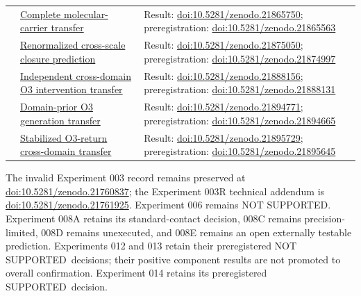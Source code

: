 \documentclass[11pt,a4paper]{article}
\newcommand{\statussupported}{\textsf{SUPPORTED}}
\newcommand{\statusnotsupported}{\textsf{NOT SUPPORTED}}
\begin{document}
\begin{longtable}{@{}>{\raggedright\arraybackslash}p{1.2cm}>{\raggedright\arraybackslash}p{5.0cm}>{\raggedright\arraybackslash}p{7.8cm}@{}}
010 & \href{https://github.com/SIEL-Research/Subjectivity-Intersection-Mathematics/tree/main/experiments/010_complete_molecular_carrier_transfer}{Complete molecular-carrier transfer} & Result: \href{https://doi.org/10.5281/zenodo.21865750}{doi:10.5281/zenodo.21865750}; preregistration: \href{https://doi.org/10.5281/zenodo.21865563}{doi:10.5281/zenodo.21865563} \\
011 & \href{https://github.com/SIEL-Research/Subjectivity-Intersection-Mathematics/tree/main/experiments/011_renormalized_cross_scale_closure_prediction}{Renormalized cross-scale closure prediction} & Result: \href{https://doi.org/10.5281/zenodo.21875050}{doi:10.5281/zenodo.21875050}; preregistration: \href{https://doi.org/10.5281/zenodo.21874997}{doi:10.5281/zenodo.21874997} \\
012 & \href{https://github.com/SIEL-Research/Subjectivity-Intersection-Mathematics/tree/main/experiments/012_cross_domain_o3_intervention_transfer}{Independent cross-domain O3 intervention transfer} & Result: \href{https://doi.org/10.5281/zenodo.21888156}{doi:10.5281/zenodo.21888156}; preregistration: \href{https://doi.org/10.5281/zenodo.21888131}{doi:10.5281/zenodo.21888131} \\
013 & \href{https://github.com/SIEL-Research/Subjectivity-Intersection-Mathematics/tree/main/experiments/013_domain_prior_o3_generation_transfer}{Domain-prior O3 generation transfer} & Result: \href{https://doi.org/10.5281/zenodo.21894771}{doi:10.5281/zenodo.21894771}; preregistration: \href{https://doi.org/10.5281/zenodo.21894665}{doi:10.5281/zenodo.21894665} \\
014 & \href{https://github.com/SIEL-Research/Subjectivity-Intersection-Mathematics/tree/main/experiments/014_stabilized_o3_return_cross_domain_transfer}{Stabilized O3-return cross-domain transfer} & Result: \href{https://doi.org/10.5281/zenodo.21895729}{doi:10.5281/zenodo.21895729}; preregistration: \href{https://doi.org/10.5281/zenodo.21895645}{doi:10.5281/zenodo.21895645} \\
\bottomrule
\end{longtable}

The invalid Experiment 003 record remains preserved at \href{https://doi.org/10.5281/zenodo.21760837}{doi:10.5281/zenodo.21760837}; the Experiment 003R technical addendum is \href{https://doi.org/10.5281/zenodo.21761925}{doi:10.5281/zenodo.21761925}. Experiment 006 remains \statusnotsupported. Experiment 008A retains its standard-contact decision, 008C remains precision-limited, 008D remains unexecuted, and 008E remains an open externally testable prediction. Experiments 012 and 013 retain their preregistered \statusnotsupported\ decisions; their positive component results are not promoted to overall confirmation. Experiment 014 retains its preregistered \statussupported\ decision.
\end{document}
